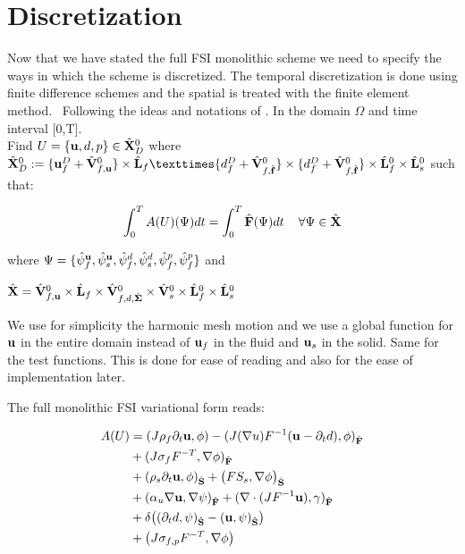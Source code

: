 \section{Discretization}\label{Discretization}
Now that we have stated the full FSI monolithic scheme we need to specify the ways in which the scheme is discretized. The temporal discretization is done using finite difference schemes and the spatial is treated with the finite element method.  \
Following the ideas and notations of \cite{Wick2011}. In the domain $\Omega$ and time interval [0,T]. \\
Find $ U = \{\bold{u}, d, p\} \in \hat{X}^0_D $ where $ \hat{X}^0_D := \{ \bold{u}^D_f + \hat{V}^0_{f,\bold{u}} \} \times \hat{L}_f \texttimes \{ d_f^D + \hat{V}^0_{f,\hat{f}} \} \times \{ d_f^D + \hat{V}^0_{f,\hat{f}} \} \times \hat{L}^0_f \times \hat{L}^0_s  $ such that:

\begin{equation}
\int_0^T A(U)(\Psi) dt = \int_0^T \hat{F}(\Psi) dt \hspace{4mm} \forall  \Psi \in \hat{X}
\end{equation}

where $ \Psi = \{  \hat{\psi}^\bold{u}_f, \hat{\psi}^\bold{u}_s, \hat{\psi}^d_f, \hat{\psi}^d_s, \hat{\psi}^p_f,\hat{\psi}^p_f  \}$ and

 $\hat{X} = \hat{V}^0_{f,\bold{u}} \times \hat{L}_f \times \hat{V}^0_{f,d,\hat{\Sigma}} \times \hat{V}_s^0 \times \hat{L}_f^0 \times \hat{L}_s^0  $


We use for simplicity the harmonic mesh motion and we use a global function for $\bold{u}$ in the entire domain instead of $\bold{u}_f$ in the fluid and $\bold{u}_s$ in the solid. Same for the test functions. This is done for ease of reading and also for the ease of implementation later.

The full monolithic FSI variational form reads:
  
\begin{align}
A(U)&= (J \rho_f \partial_t \bold{u} , \phi ) - (J (\nabla u)F^{-1}(\bold{u} - \partial_t d) , \phi )_{\mathcal{\hat{F}}}  \\
       &+ ( J \sigma_{f} F^{-T} , \nabla \phi )_{\mathcal{\hat{F}}} \\
       &+ (\rho_s \partial_t \bold{u} , \phi)_{\mathcal{\hat{S}}}   + \big(F S_s, \nabla \phi \big)_{\mathcal{\hat{S}}} \\
       &+ ( \alpha_u \nabla \bold{u}, \nabla \psi)_{\mathcal{\hat{F}}} + (\nabla \cdot (J F^{-1} \bold{u}),\gamma )_{\mathcal{\hat{F}}} \\
       \label{eq:condition}
       &+ \delta\big((\partial_t d , \psi)_{\mathcal{\hat{S}}}  - ( \bold{u} , \psi )_{\mathcal{\hat{S}}}\big) \\ 
       &+  \big( J \sigma_{f,p} F^{-T}, \nabla \phi  \big) 	 		
\end{align}

